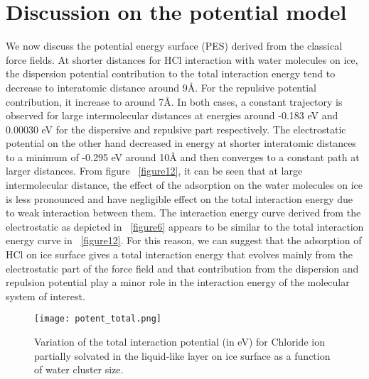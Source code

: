 \documentclass[a4paper,11pt]{report}
\begin{document}
\section{Discussion on the potential model}
We now discuss the potential energy surface (PES) derived from the classical force fields. At shorter distances for HCl interaction with water molecules on ice, the dispersion potential contribution to the total interaction energy tend to decrease to interatomic distance around 9{{\AA}}. For the repulsive potential contribution, it increase to around 7{{\AA}}. In both cases, a constant trajectory is observed for large intermolecular distances at energies around -0.183 eV and 0.00030 eV for the dispersive and repulsive part respectively. The electrostatic potential on the other hand decreased in energy at shorter interatomic distances to a minimum of -0.295 eV around 10{{\AA}} and then converges to a constant path at larger distances. From figure ~\ref{figure12}, it can be seen that at large intermolecular distance, the effect of the adsorption on the water molecules on ice is less pronounced and have negligible effect on the total interaction energy due to weak interaction between them. The interaction energy curve derived from the electrostatic as depicted in ~\ref{figure6} appears to be similar to the total interaction energy curve in ~\ref{figure12}. For this reason, we can suggest that the adsorption of HCl on ice surface gives a total interaction energy that evolves mainly from the electrostatic part of the force field and that contribution from the dispersion and repulsion potential play a minor role in the interaction energy of the molecular system of interest.

\begin{figure}[H]\large
\captionsetup{font=footnotesize}
\texttt{[image: potent\_total.png]}
\caption{Variation of the total interaction potential (in eV) for Chloride ion partially solvated in the liquid-like layer on ice surface as a function of water cluster size.}
\label{figure103}
\end{figure}
\end{document}
